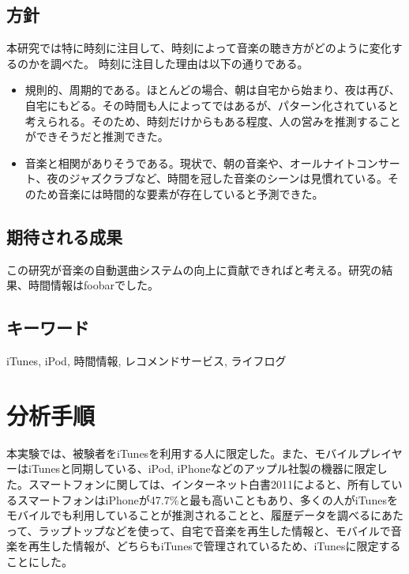 \documentclass[11pt, twocolumn]{jsarticle}
\begin{document}
\subsection{方針}
本研究では特に時刻に注目して、時刻によって音楽の聴き方がどのように変化するのかを調べた。
時刻に注目した理由は以下の通りである。
\begin{itemize}
\item
規則的、周期的である。ほとんどの場合、朝は自宅から始まり、夜は再び、自宅にもどる。その時間も人によってではあるが、パターン化されていると考えられる。そのため、時刻だけからもある程度、人の営みを推測することができそうだと推測できた。
\item
音楽と相関がありそうである。現状で、朝の音楽や、オールナイトコンサート、夜のジャズクラブなど、時間を冠した音楽のシーンは見慣れている。そのため音楽には時間的な要素が存在していると予測できた。
\end{itemize}

\subsection{期待される成果}
この研究が音楽の自動選曲システムの向上に貢献できればと考える。研究の結果、時間情報はfoobarでした。
\subsection{キーワード}
iTunes, iPod, 時間情報, レコメンドサービス, ライフログ

\section{分析手順}
本実験では、被験者をiTunesを利用する人に限定した。また、モバイルプレイヤーはiTunesと同期している、iPod, iPhoneなどのアップル社製の機器に限定した。スマートフォンに関しては、インターネット白書2011によると、所有しているスマートフォンはiPhoneが47.7\%と最も高いこともあり、多くの人がiTunesをモバイルでも利用していることが推測されることと、履歴データを調べるにあたって、ラップトップなどを使って、自宅で音楽を再生した情報と、モバイルで音楽を再生した情報が、どちらもiTunesで管理されているため、iTunesに限定することにした。
\end{document}
